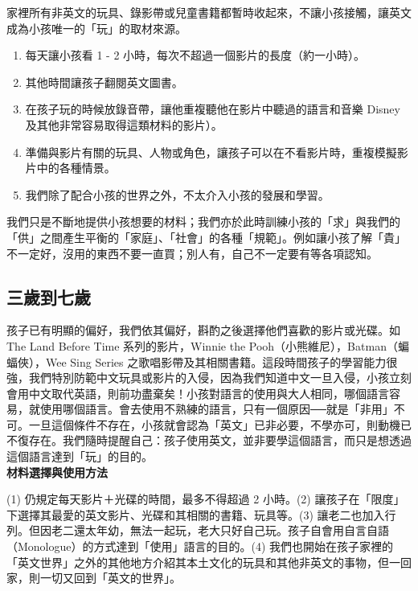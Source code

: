 \documentclass[12pt, a4paper]{article}
\begin{document}
家裡所有非英文的玩具、錄影帶或兒童書籍都暫時收起來，不讓小孩接觸，讓英文成為小孩唯一的「玩」的取材來源。
\begin{enumerate}
\item 每天讓小孩看 1 - 2 小時，每次不超過一個影片的長度（約一小時）。
\item 其他時間讓孩子翻閱英文圖書。
\item 在孩子玩的時候放錄音帶，讓他重複聽他在影片中聽過的語言和音樂 Disney 及其他非常容易取得這類材料的影片）。
\item 準備與影片有關的玩具、人物或角色，讓孩子可以在不看影片時，重複模擬影片中的各種情景。
\item 我們除了配合小孩的世界之外，不太介入小孩的發展和學習。
\end{enumerate}
我們只是不斷地提供小孩想要的材料；我們亦於此時訓練小孩的「求」與我們的「供」之間產生平衡的「家庭」、「社會」的各種「規範」。例如讓小孩了解「貴」不一定好，沒用的東西不要一直買；別人有，自己不一定要有等各項認知。

\subsection{三歲到七歲}
孩子已有明顯的偏好，我們依其偏好，斟酌之後選擇他們喜歡的影片或光碟。如 The Land Before Time 系列的影片，Winnie the Pooh（小熊維尼），Batman（蝙蝠俠），Wee Sing Series 之歌唱影帶及其相關書籍。這段時間孩子的學習能力很強，我們特別防範中文玩具或影片的入侵，因為我們知道中文一旦入侵，小孩立刻會用中文取代英語，則前功盡棄矣！小孩對語言的使用與大人相同，哪個語言容易，就使用哪個語言。會去使用不熟練的語言，只有一個原因──就是「非用」不可。一旦這個條件不存在，小孩就會認為「英文」已非必要，不學亦可，則動機已不復存在。我們隨時提醒自己：孩子使用英文，並非要學這個語言，而只是想透過這個語言達到「玩」的目的。\\

\textbf{材料選擇與使用方法}

(1) 仍規定每天影片＋光碟的時間，最多不得超過 2 小時。(2) 讓孩子在「限度」下選擇其最愛的英文影片、光碟和其相關的書籍、玩具等。(3) 讓老二也加入行列。但因老二還太年幼，無法一起玩，老大只好自己玩。孩子自會用自言自語（Monologue）的方式達到「使用」語言的目的。(4) 我們也開始在孩子家裡的「英文世界」之外的其他地方介紹其本土文化的玩具和其他非英文的事物，但一回家，則一切又回到「英文的世界」。
\end{document}

